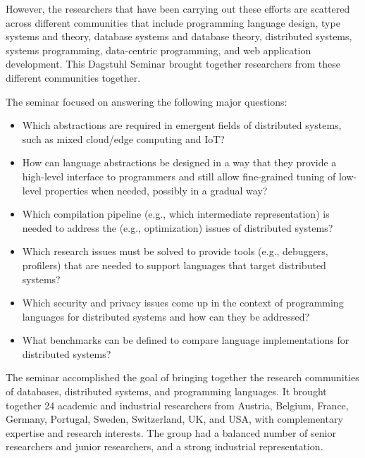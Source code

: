 \documentclass[a4paper,UKenglish]{dagrep-v2018}
\begin{document}
However, the researchers that have been carrying out these efforts are scattered across different communities that include programming language design, type systems and theory, database systems and database theory, distributed systems, systems programming, data-centric programming, and web application development. This Dagstuhl Seminar brought together researchers from these different communities together.

The seminar focused on answering the following major questions: %

\begin{itemize}

\item Which abstractions are required in emergent fields of distributed systems, such as mixed cloud/edge computing and IoT?

\item How can language abstractions be designed in a way that they provide a high-level interface to programmers and still allow fine-grained tuning of low-level properties when needed, possibly in a gradual way?

\item Which compilation pipeline (e.g., which intermediate representation) is needed to address the (e.g., optimization) issues of distributed systems?

\item Which research issues must be solved to provide tools (e.g., debuggers, profilers) that are needed to support languages that target distributed systems?

\item Which security and privacy issues come up in the context of programming languages for distributed systems and how can they be addressed?

\item What benchmarks can be defined to compare language implementations for distributed systems?
\end{itemize}

The seminar accomplished the goal of bringing together the research communities of databases, distributed systems, and programming languages. It brought together 24 academic and industrial researchers from Austria, Belgium, France, Germany, Portugal, Sweden, Switzerland, UK, and USA, with complementary expertise and research interests. 
The group had a balanced number of senior researchers and junior researchers, and a strong industrial representation.
\end{document}
